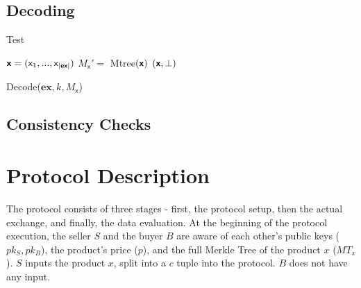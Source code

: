 \documentclass{cacthesis}
\newcounter{protocol}
\begin{document}
        \subsection{Decoding}
        Test
        \begin{center}
        \begin{minipage}[t]{3.15in}
            \begin{algorithm}[H]
                 $\textsf{\textbf{x}} = (\textsf{x}_1,..., \textsf{x}_{|\textsf{\textbf{ex}}|})$\;
                 $M_\textsf{x}' = $ \textsf{Mtree}$(\textsf{\textbf{x}})$\;
                \Return $(\textsf{\textbf{x}}, \perp)$\;
                \caption{\textsf{Decode($\textbf{ex}, k, M_\textsf{x}$)}}
            \end{algorithm}
        \end{minipage}
        \end{center}
        
        \subsection{Consistency Checks}
        
        \newpage
        
        \section{Protocol Description}
        The protocol consists of three stages - first, the protocol setup, then the actual exchange, and finally, the data evaluation. 
        At the beginning of the protocol execution, the seller $S$ and the buyer $B$ are aware of each other's public keys ($pk_S, pk_B$), the product's price ($p$), and the full Merkle Tree of the product $x$ ($MT_x$). $S$ inputs the product $x$, split into a $c$ tuple into the protocol. $B$ does not have any input.
\end{document}
